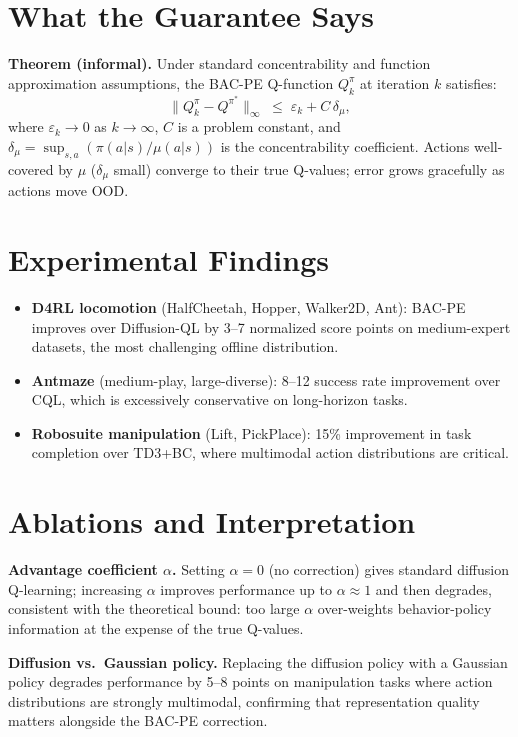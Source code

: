 \documentclass[10pt,twocolumn]{article}
\begin{document}
\section{What the Guarantee Says}

\textbf{Theorem (informal).} Under standard concentrability and function approximation
assumptions, the BAC-PE Q-function $Q^\pi_k$ at iteration $k$ satisfies:
\[
\|Q^\pi_k - Q^{\pi^*}\|_\infty \;\leq\; \varepsilon_k + C\,\delta_\mu,
\]
where $\varepsilon_k \to 0$ as $k \to \infty$, $C$ is a problem constant, and
$\delta_\mu = \sup_{s,a}(\pi(a|s)/\mu(a|s))$ is the concentrability coefficient.
Actions well-covered by $\mu$ ($\delta_\mu$ small) converge to their true Q-values;
error grows gracefully as actions move OOD.

\section{Experimental Findings}

\begin{itemize}[itemsep=2pt,parsep=0pt]
  \item \textbf{D4RL locomotion} (HalfCheetah, Hopper, Walker2D, Ant):
    BAC-PE improves over Diffusion-QL by 3--7 normalized score points on
    medium-expert datasets, the most challenging offline distribution.
  \item \textbf{Antmaze} (medium-play, large-diverse): 8--12 success rate
    improvement over CQL, which is excessively conservative on long-horizon tasks.
  \item \textbf{Robosuite manipulation} (Lift, PickPlace): 15\% improvement
    in task completion over TD3+BC, where multimodal action distributions are critical.
\end{itemize}

\section{Ablations and Interpretation}

\textbf{Advantage coefficient $\alpha$.} Setting $\alpha = 0$ (no correction) gives
standard diffusion Q-learning; increasing $\alpha$ improves performance up to $\alpha
\approx 1$ and then degrades, consistent with the theoretical bound: too large
$\alpha$ over-weights behavior-policy information at the expense of the true Q-values.

\textbf{Diffusion vs.\ Gaussian policy.} Replacing the diffusion policy with a
Gaussian policy degrades performance by 5--8 points on manipulation tasks where
action distributions are strongly multimodal, confirming that representation quality
matters alongside the BAC-PE correction.
\end{document}
